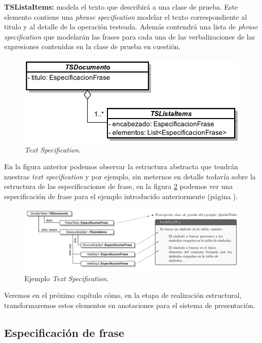 \medskip
\noindent
\textbf{TSListaItems:} modela el texto que describirá a una clase de prueba. Este elemento contiene una \emph{phrase specification} modelar el texto correspondiente al titulo y al detalle de la operación testeada. Además contendrá una lista de \emph{phrase specification} que modelarán las frases para cada una de las verbalizaciones de las expresiones contenidas en la clase de prueba en cuestión.

\begin{figure}[H]
  	\centering
	\includegraphics[scale=0.3]{img/text_spec.png}
	\caption{\emph{Text Specification}.}
  	\label{fig:text_spec}
\end{figure}

En la figura anterior podemos observar la estructura abstracta que tendrán nuestras \emph{text specification} y por ejemplo, sin meternos en detalle todavía sobre la estructura de las especificaciones de frase, en la figura \ref{fig:text_spec_ej} podemos ver una especificación de frase para el ejemplo introducido anteriormente (página \pageref{fig:ej_corpus}).

\begin{figure}[H]
  	\centering
	\includegraphics[scale=0.35]{img/ej_text_spec.png}
	\caption{Ejemplo \emph{Text Specification}.}
  \label{fig:text_spec_ej}
\end{figure}

Veremos en el próximo capítulo cómo, en la etapa de realización estructural, transformaremos estos elementos en anotaciones para el sistema de presentación.

\subsection{Especificación de frase}

